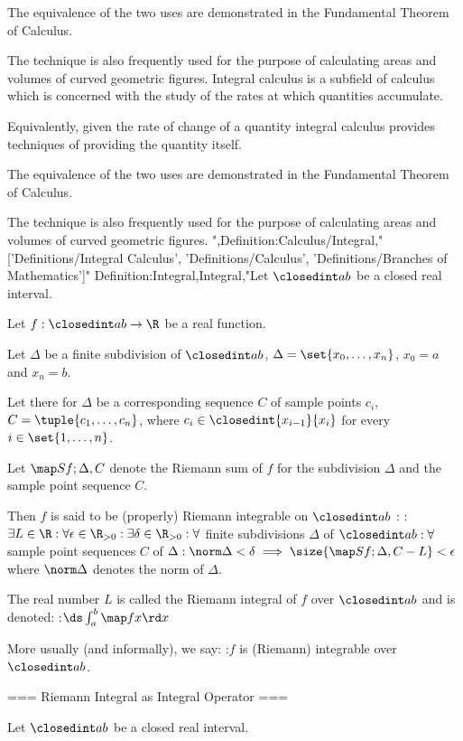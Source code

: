 The equivalence of the two uses are demonstrated in the Fundamental Theorem of Calculus.

The technique is also frequently used for the purpose of calculating areas and volumes of curved geometric figures.
Integral calculus is a subfield of calculus which is concerned with the study of the rates at which quantities accumulate.

Equivalently, given the rate of change of a quantity integral calculus provides techniques of providing the quantity itself.

The equivalence of the two uses are demonstrated in the Fundamental Theorem of Calculus.

The technique is also frequently used for the purpose of calculating areas and volumes of curved geometric figures.
",Definition:Calculus/Integral,"['Definitions/Integral Calculus', 'Definitions/Calculus', 'Definitions/Branches of Mathematics']"
Definition:Integral,Integral,"Let $\closedint a b$ be a closed real interval.

Let $f: \closedint a b \to \R$ be a real function.

Let $\Delta$ be a finite subdivision of $\closedint a b$, $\Delta = \set {x_0, \ldots, x_n}$, $x_0 = a$ and $x_n = b$.

Let there for $\Delta$ be a corresponding sequence $C$ of sample points $c_i$, $C = \tuple {c_1, \ldots, c_n}$, where $c_i \in \closedint {x_{i - 1} } {x_i}$ for every $i \in \set {1, \ldots, n}$.

Let $\map S {f; \Delta, C}$ denote the Riemann sum of $f$ for the subdivision $\Delta$ and the sample point sequence $C$.


Then $f$ is said to be (properly) Riemann integrable on $\closedint a b$ :
:$\exists L \in \R: \forall \epsilon \in \R_{>0}: \exists \delta \in \R_{>0}: \forall$ finite subdivisions $\Delta$ of $\closedint a b: \forall$ sample point sequences $C$ of $\Delta: \norm \Delta < \delta \implies \size {\map S {f; \Delta, C} - L} < \epsilon$
where $\norm \Delta$ denotes the norm of $\Delta$.


The real number $L$ is called the Riemann integral of $f$ over $\closedint a b$ and is denoted:
:$\ds \int_a^b \map f x \rd x$


More usually (and informally), we say:
:$f$ is (Riemann) integrable over $\closedint a b$.


=== Riemann Integral as Integral Operator ===

Let $\closedint a b$ be a closed real interval.

